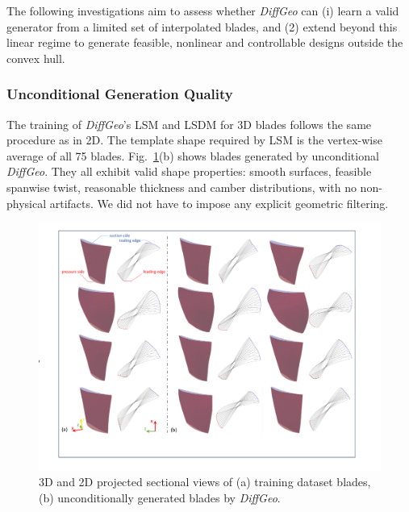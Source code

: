 The following investigations aim to assess whether \textit{DiffGeo} can (i) learn a valid generator from a limited set of interpolated blades, and (2) extend beyond this linear regime to generate feasible, nonlinear and controllable designs outside the convex hull.

\subsubsection{Unconditional Generation Quality}
The training of \textit{DiffGeo}'s LSM and LSDM for 3D blades follows the same procedure as in 2D. The template shape required by LSM is the vertex-wise average of all 75 blades. Fig.~\ref{ch6:fig:unconditional_blades}(b) shows blades generated by unconditional \textit{DiffGeo}. They all exhibit valid shape properties: smooth surfaces, feasible spanwise twist, reasonable thickness and camber distributions, with no non-physical artifacts. We did not have to impose any explicit geometric filtering.

\begin{figure}[!htb]
    \begin{center}
        \includegraphics[width=1\linewidth]{chapter6/fig/fig_unconditional_blades.pdf}
    \end{center}
    \caption{
        \small 3D and 2D projected sectional views of (a) training dataset blades, (b) unconditionally generated blades by \textit{DiffGeo}.
    }
    \label{ch6:fig:unconditional_blades}
\end{figure}

